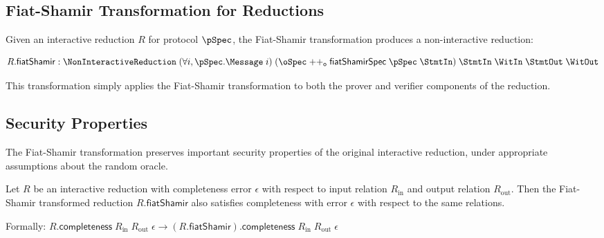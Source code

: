 \subsection{Fiat-Shamir Transformation for Reductions}\label{sec:fiat_shamir_reduction}

\begin{definition}
    \label{def:reduction_fiat_shamir}
    Given an interactive reduction $R$ for protocol $\pSpec$, the Fiat-Shamir transformation produces a non-interactive reduction:

    \[ R.\mathsf{fiatShamir} : \NonInteractiveReduction \;(\forall i, \pSpec.\Message \;i) \;(\oSpec \mathrel{++_\mathsf{o}} \mathsf{fiatShamirSpec} \;\pSpec \;\StmtIn) \;\StmtIn \;\WitIn \;\StmtOut \;\WitOut \]

    This transformation simply applies the Fiat-Shamir transformation to both the prover and verifier components of the reduction.
\end{definition}

\subsection{Security Properties}\label{sec:fiat_shamir_security}

The Fiat-Shamir transformation preserves important security properties of the original interactive reduction, under appropriate assumptions about the random oracle.

\begin{theorem}
    \label{thm:fiat_shamir_completeness}
    Let $R$ be an interactive reduction with completeness error $\epsilon$ with respect to input relation $R_{\text{in}}$ and output relation $R_{\text{out}}$. Then the Fiat-Shamir transformed reduction $R.\mathsf{fiatShamir}$ also satisfies completeness with error $\epsilon$ with respect to the same relations.

    Formally: $R.\mathsf{completeness} \;R_{\text{in}} \;R_{\text{out}} \;\epsilon \to (R.\mathsf{fiatShamir}).\mathsf{completeness} \;R_{\text{in}} \;R_{\text{out}} \;\epsilon$
\end{theorem}

